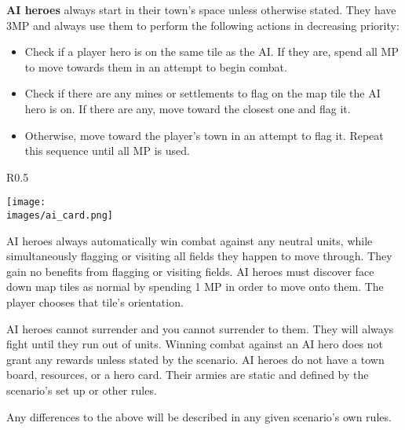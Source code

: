 \clearpage
\textbf{AI heroes} always start in their town's space unless otherwise stated.
They have 3MP and always use them to perform the following actions in decreasing priority:
\begin{itemize}
  \item Check if a player hero is on the same tile as the AI.
    If they are, spend all MP to move towards them in an attempt to begin combat.
  \item Check if there are any mines or settlements to flag on the map tile the AI hero is on.
    If there are any, move toward the closest one and flag it.
  \item Otherwise, move toward the player's town in an attempt to flag it.
Repeat this sequence until all MP is used.
\end{itemize}
\begin{wrapfigure}{R}{0.5\textwidth}
  \begin{center}
  \texttt{[image: \\images/ai\_card.png]}
  \end{center}
\end{wrapfigure}
AI heroes always automatically win combat against any neutral units, while simultaneously flagging or visiting all fields they happen to move through.
They gain no benefits from flagging or visiting fields.
AI heroes must discover face down map tiles as normal by spending 1 MP in order to move onto them.
The player chooses that tile’s orientation.\par
AI heroes cannot surrender and you cannot surrender to them.
They will always fight until they run out of units.
Winning combat against an AI hero does not grant any rewards unless stated by the scenario.
AI heroes do not have a town board, resources, or a hero card.
Their armies are static and defined by the scenario’s set up or other rules.\par
Any differences to the above will be described in any given scenario’s own rules.
